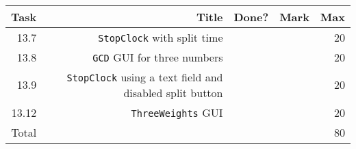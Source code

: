\newcommand{\class}[1]{\texttt{#1}}
\newcommand{\method}[2]{\texttt{#2()}}
\\ \\ \\ \noindent\parbox[l]{\textwidth}{
 \\ \\
\begin{tabular}{||r|r|r|r|r||} \hline \hline
Task  & Title                            & Done? & Mark & Max \\ \hline
13.7 & \class{StopClock} with split time & & & 20 \\ \hline
13.8 & \class{GCD} GUI for three numbers & & & 20 \\ \hline
13.9 & \class{StopClock} using a text field and disabled split button & & & 20 \\ \hline
13.12 & \class{ThreeWeights} GUI & & & 20 \\ \hline
\hline
Total &                                  &       &      & 80 \\ \hline
\hline
\end{tabular} \\ \\
}
